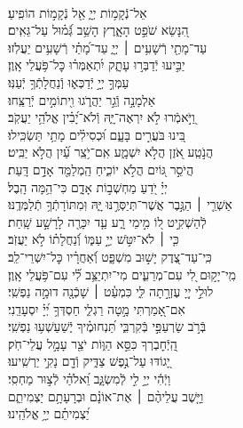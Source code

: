 \documentclass[twoside, openany, parskip=half, 11pt]{book}
\begin{document}
\\
\vspace{-1.5\baselineskip}
\begin{narrow}
%
אֵל־נְֿקָמ֥וֹת יְיָ֑ \hfill אֵ֖ל נְֿקָמ֣וֹת הוֹפִֽיעַ׃ \\
הִ֭נָּשֵׂא שֹׁפֵ֣ט הָאָ֑רֶץ \hfill הָשֵׁ֥ב גְּֿ֝מ֗וּל עַל־גֵּאִֽים׃ \\
עַד־מָתַ֖י רְֿשָׁעִ֥ים ׀ יְיָ֑ \hfill עַד־מָ֝תַ֗י רְֿשָׁעִ֥ים יַעֲלֹֽזוּ׃ \\
יַבִּ֣יעוּ יְֿדַבְּר֣וּ עָתָ֑ק \hfill יִ֝תְאַמְּר֗וּ כׇּל־פֹּ֥עֲלֵי אָֽוֶן׃ \\
עַמְּךָ֣ יְיָ֣ יְֿדַכְּא֑וּ \hfill וְֽֿנַחֲלָתְֿךָ֥ יְֿעַנּֽוּ׃ \\
אַלְמָנָ֣ה וְֿגֵ֣ר יַהֲרֹ֑גוּ \hfill וִ֖יתוֹמִ֣ים יְֿרַצֵּֽחוּ׃ \\
וַ֭יֹּ֣אמְֿרוּ לֹ֣א יִרְאֶה־יָּ֑הּ \hfill וְֿלֹא־יָ֝בִ֗ין אֱלֹהֵ֥י יַעֲקֹֽב׃ \\
בִּ֭ינוּ בֹּעֲרִ֣ים בָּעָ֑ם \hfill וּ֝כְסִילִ֗ים מָתַ֥י תַּשְׂכִּֽילוּ׃ \\
הֲנֹ֣טַֽע אֹ֭זֶן הֲלֹ֣א יִשְׁמָ֑ע \hfill אִֽם־יֹ֥צֵֽר עַ֗֝יִן הֲלֹ֣א יַבִּֽיט׃ \\
הֲיֹסֵ֣ר גּ֭וֹיִם הֲלֹ֣א יוֹכִ֑יחַ \hfill הַֽמְלַמֵּ֖ד אָדָ֣ם דָּֽעַת׃ \\
יְיָ֗ יֹ֭דֵעַ מַחְשְׁב֣וֹת אָדָ֑ם \hfill כִּי־הֵ֥מָּה הָֽבֶל׃ \\
אַשְׁרֵ֤י ׀ הַגֶּ֣בֶר אֲשֶׁר־תְּיַסְּרֶ֣נּוּ יָּ֑הּ \hfill וּֽמִתּוֹרָתְֿךָ֥ תְֿלַמְּדֶֽנּוּ׃ \\
לְֿהַשְׁקִ֣יט ל֭וֹ מִ֣ימֵי רָ֑ע \hfill עַ֤ד יִכָּרֶ֖ה לָרָשָׁ֣ע שָֽׁחַת׃ \\
כִּ֤י ׀ לֹא־יִטֹּ֣שׁ יְיָ֣ עַמּ֑וֹ \hfill וְֿ֝נַחֲלָת֗וֹ לֹ֣א יַעֲזֹֽב׃ \\
כִּֽי־עַד־צֶ֭דֶק יָשׁ֣וּב מִשְׁפָּ֑ט \hfill וְֿ֝אַחֲרָ֗יו כׇּל־יִשְׁרֵי־לֵֽב׃ \\
מִֽי־יָק֣וּם לִ֭י עִם־מְרֵעִ֑ים \hfill מִי־יִתְיַצֵּ֥ב לִ֗֝י עִם־פֹּ֥עֲלֵי אָֽוֶן׃ \\
לוּלֵ֣י יְיָ֭ עֶזְרָ֣תָה לִּ֑י \hfill כִּמְעַ֓ט ׀ שָׁכְֿנָ֖ה דוּמָ֣ה נַפְשִֽׁי׃ \\
אִם־אָ֭מַרְתִּי מָ֣טָה רַגְלִ֑י \hfill חַסְדְּךָ֥ יְ֝יָ֗ יִסְעָדֵֽנִי׃ \\
בְּֿרֹ֣ב שַׂרְעַפַּ֣י בְּֿקִרְבִּ֑י \hfill תַּ֝נְחוּמֶ֗יךָ יְֽֿשַׁעַשְׁע֥וּ נַפְשִֽׁי׃ \\
הַֽ֭יְֿחׇבְרְךָ כִּסֵּ֣א הַוּ֑וֹת \hfill יֹצֵ֖ר עָמָ֣ל עֲלֵי־חֹֽק׃ \\
יָ֭גוֹדּוּ עַל־נֶ֣פֶשׁ צַדִּ֑יק \hfill וְֿדָ֖ם נָקִ֣י יַרְשִֽׁיעוּ׃ \\
וַיְֿהִ֬י יְיָ֣ לִ֣י לְֿמִשְׂגָּ֑ב \hfill וֵ֝אלֹהַ֗י לְֿצ֣וּר מַחְסִֽי׃ \\
וַיָּ֤שֶׁב עֲלֵיהֶ֨ם ׀ אֶת־אוֹנָ֗ם \hfill וּבְרָעָתָ֥ם יַצְמִיתֵ֑ם\\ יַ֝צְמִיתֵ֗ם יְיָ֥ אֱלֹהֵֽינוּ׃ \hfill \break
\end{narrow}
\end{document}
